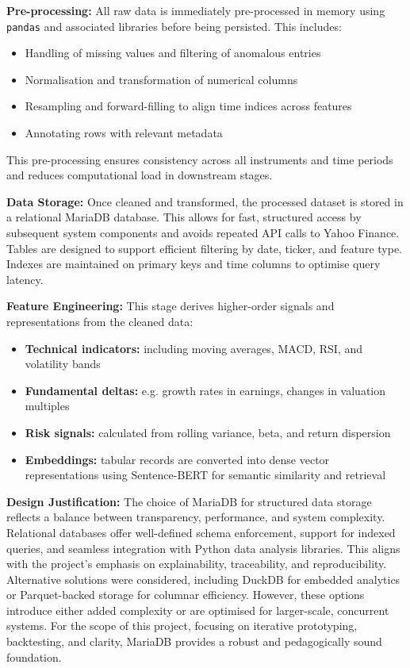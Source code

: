 \textbf{Pre-processing:} All raw data is immediately pre-processed in memory using \texttt{pandas} and associated libraries before being persisted. This includes:
\begin{itemize}
    \item Handling of missing values and filtering of anomalous entries
    \item Normalisation and transformation of numerical columns
    \item Resampling and forward-filling to align time indices across features
    \item Annotating rows with relevant metadata
\end{itemize}
This pre-processing ensures consistency across all instruments and time periods and reduces computational load in downstream stages.

\textbf{Data Storage:} Once cleaned and transformed, the processed dataset is stored in a relational MariaDB database. This allows for fast, structured access by subsequent system components and avoids repeated API calls to Yahoo Finance. Tables are designed to support efficient filtering by date, ticker, and feature type. Indexes are maintained on primary keys and time columns to optimise query latency.

\textbf{Feature Engineering:} This stage derives higher-order signals and representations from the cleaned data:
\begin{itemize}
    \item \textbf{Technical indicators:} including moving averages, MACD, RSI, and volatility bands
    \item \textbf{Fundamental deltas:} e.g. growth rates in earnings, changes in valuation multiples
    \item \textbf{Risk signals:} calculated from rolling variance, beta, and return dispersion
    \item \textbf{Embeddings:} tabular records are converted into dense vector representations using Sentence-BERT for semantic similarity and retrieval
\end{itemize}

\textbf{Design Justification:} The choice of MariaDB for structured data storage reflects a balance between transparency, performance, and system complexity. Relational databases offer well-defined schema enforcement, support for indexed queries, and seamless integration with Python data analysis libraries. This aligns with the project's emphasis on explainability, traceability, and reproducibility. Alternative solutions were considered, including DuckDB for embedded analytics or Parquet-backed storage for columnar efficiency. However, these options introduce either added complexity or are optimised for larger-scale, concurrent systems. For the scope of this project, focusing on iterative prototyping, backtesting, and clarity, MariaDB provides a robust and pedagogically sound foundation.

